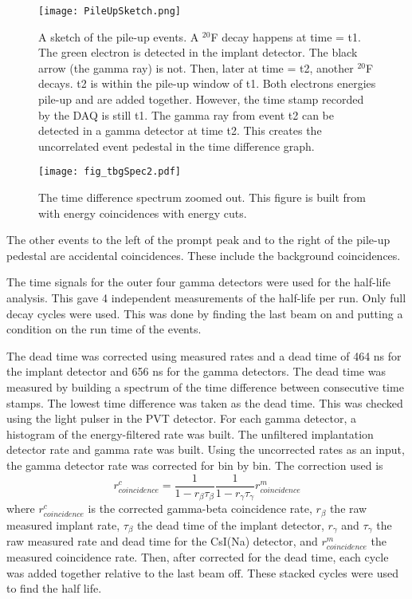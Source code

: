 \documentclass[MaxHughesThesis.tex]{subfiles}
\begin{document}
\begin{figure}
	\centerline{\texttt{[image: PileUpSketch.png]}}
	\caption{A sketch of the pile-up events.
		 A $^{20}$F decay happens at time = t1.
		 The green electron is detected in the implant detector.
		 The black arrow (the gamma ray) is not.
		 Then, later at time = t2, another $^{20}$F decays.
		 t2 is within the pile-up window of t1.
		 Both electrons energies pile-up and are added together.
		 However, the time stamp recorded by the DAQ is still t1.
		 The gamma ray from event t2 can be detected in a gamma detector at time t2.
		 This creates the uncorrelated event pedestal in the time difference graph.
		 }
	\label{fig:PileUp}
\end{figure}

\begin{figure}
	\centerline{\texttt{[image: fig\_tbgSpec2.pdf]}}	
	\caption{The time difference spectrum zoomed out.
		 This figure is built from with energy coincidences with energy cuts.}
	\label{fig:timediff2}
\end{figure}

The other events to the left of the prompt peak and to the right of the pile-up pedestal are accidental coincidences.
These include the background coincidences.

The time signals for the outer four gamma detectors were used for the half-life analysis.
This gave 4 independent measurements of the half-life per run. 
Only full decay cycles were used. 
This was done by finding the last beam on and putting a condition on the run time of the events.

The dead time was corrected using measured rates and a dead time of 464 ns for the implant detector and 656 ns for the gamma detectors.  
The dead time was measured by building a spectrum of the time difference between consecutive time stamps.
The lowest time difference was taken as the dead  time. 
This was checked using the light pulser in the PVT detector.
For each gamma detector, a histogram of the energy-filtered rate was built.
The unfiltered implantation detector rate and gamma rate was built.
Using the uncorrected rates as an input, the gamma detector rate was corrected for bin by bin.
The correction used is 
%
\begin{equation}
r^{c}_{coincidence} = \frac{1}{1 - r_{\beta}\tau_{\beta}}\frac{1}{1 - r_{\gamma}\tau_{\gamma}}r^{m}_{coincidence} 
	\label{eq:dtc} 
\end{equation}
%
where $r^{c}_{coincidence}$ is the corrected gamma-beta coincidence rate, $r_{\beta}$ the raw measured implant rate, $\tau_{\beta}$ the dead time of the implant detector, $r_{\gamma}$ and $\tau_{\gamma}$ the raw measured rate and dead time for the CsI(Na) detector, and $r^{m}_{coincidence}$ the measured coincidence rate.   
Then, after corrected for the dead time, each cycle was added together relative to the last beam off.
These stacked cycles were used to find the half life.
\end{document}
